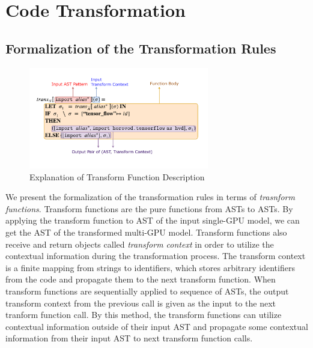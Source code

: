 \section{Code Transformation}\label{sec:trans}

\subsection{Formalization of the Transformation Rules}

\begin{figure}[ht!]
    \centering
    \includegraphics[width=0.7\textwidth]{transfn_expl.pdf}
    \caption{Explanation of Transform Function Description}
    \label{fig:trans:fnexpl}
\end{figure}

We present the formalization of the transformation rules in terms of
\textit{trasnform functions}.
Transform functions are the pure functions from ASTs to ASTs.
By applying the transform function to AST of the input single-GPU model,
we can get the AST of the transformed multi-GPU model.
Transform functions also receive and return objects called \textit{transform
context} in order to utilize the contextual information during the 
transformation process.
The transform context is a finite mapping from strings to identifiers, which
stores arbitrary identifiers from the code and propagate them to the 
next transform function.
When transform functions are sequentially applied to sequence of ASTs, 
the output transform context from the previous call is given as the input
to the next tranform function call.
By this method, the transform functions can utilize contextual information
outside of their input AST and propagate some contextual information from
their input AST to next transform function calls.

